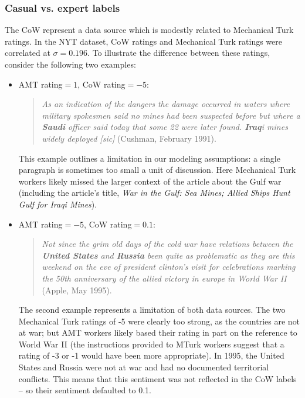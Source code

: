 \subsubsection{Casual vs. expert labels}
The CoW represent a data source which is modestly related to
Mechanical Turk ratings. In the NYT dataset, CoW ratings and
Mechanical Turk ratings were correlated at $\sigma=0.196$.  To
illustrate the difference between these ratings, consider the
following two examples:
\begin{itemize}
  \item AMT rating$= 1$, CoW rating$=-5$:
\begin{quote} 
  \emph{As an
    indication of the dangers the damage occurred in waters where
    military spokesmen said no mines had been suspected before but
    where a \textbf{Saudi} officer said today that some 22 were later
    found. \textbf{Iraq}i mines widely deployed [sic]} (Cushman, February 1991).
  \nocite{cushman:1991}
\end{quote}
This example outlines a limitation in our modeling
assumptions: a single paragraph is sometimes too small a unit of
discussion.  Here Mechanical Turk workers likely missed
the larger context of the article about the Gulf war (including the
article's title, \emph{War in the Gulf: Sea Mines; Allied Ships Hunt
  Gulf for Iraqi Mines}).
\item AMT rating$ = -5$, CoW rating$=0.1$: \begin{quote}\emph{Not since
    the grim old days of the cold war have relations between the
    \textbf{United States} and \textbf{Russia} been quite as problematic as they
    are this weekend on the eve of president clinton's visit for
    celebrations marking the 50th anniversary of the allied victory in
    europe in World War II} (Apple, May 1995). \nocite{apple:1995}
\end{quote}
The second example represents a limitation of both data sources.  The
two Mechanical Turk ratings of -5 were clearly too strong, as the
countries are not at war; but AMT workers likely based their rating in
part on the reference to World War II (the instructions provided to
MTurk workers suggest that a rating of -3 or -1 would have been more
appropriate).  In 1995, the United States and Russia were not at war
and had no documented territorial conflicts.  This means that this
sentiment was not reflected in the CoW labels -- so their sentiment
defaulted to 0.1.
\end{itemize}

\label{section:experiments}

